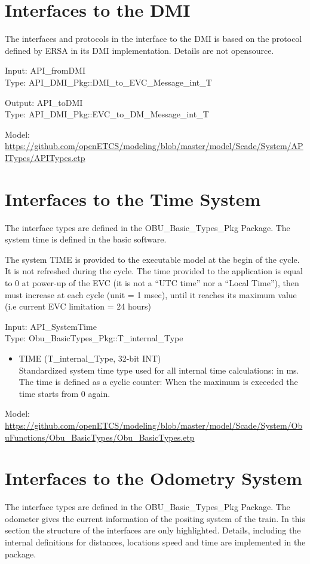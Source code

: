 \documentclass{template/openetcs_report}
\begin{document}
\section{Interfaces to the DMI}

The interfaces and protocols in the interface to the DMI is based on the protocol defined by ERSA in its DMI implementation. Details are not opensource.

Input: API\_fromDMI\\
Type: API\_DMI\_Pkg::DMI\_to\_EVC\_Message\_int\_T

Output: API\_toDMI\\
Type: API\_DMI\_Pkg::EVC\_to\_DM\_Message\_int\_T

Model: \url{https://github.com/openETCS/modeling/blob/master/model/Scade/System/APITypes/APITypes.etp}

\section{Interfaces to the Time System}
The interface types are defined in the OBU\_Basic\_Types\_Pkg Package. The system time is defined in the basic software.

The system TIME is provided to the executable model at the begin of the cycle. It is not refreshed during the cycle. The time provided to the application is equal to 0 at power-up of the EVC (it is not a “UTC time” nor a “Local
Time”), then must increase at each cycle (unit = 1 msec), until it reaches its maximum value (i.e current EVC
limitation = 24 hours)

Input: API\_SystemTime\\
Type: Obu\_BasicTypes_Pkg::T\_internal\_Type

\begin{itemize}
\item TIME (T\_internal\_Type, 32-bit INT)\\
Standardized system time type used for all internal time calculations: in ms. The time is defined as a cyclic counter: When the maximum is exceeded the time starts from 0 again. 
\end{itemize}

Model: \url{https://github.com/openETCS/modeling/blob/master/model/Scade/System/ObuFunctions/Obu_BasicTypes/Obu_BasicTypes.etp}

\section{Interfaces to the Odometry System}
The interface types are defined in the OBU\_Basic\_Types\_Pkg Package. 
The odometer gives the current information of the positing system of the train. In this section the structure of the interfaces are only highlighted. Details, including the internal definitions for distances, locations speed and time are implemented in the package. 
\end{document}
